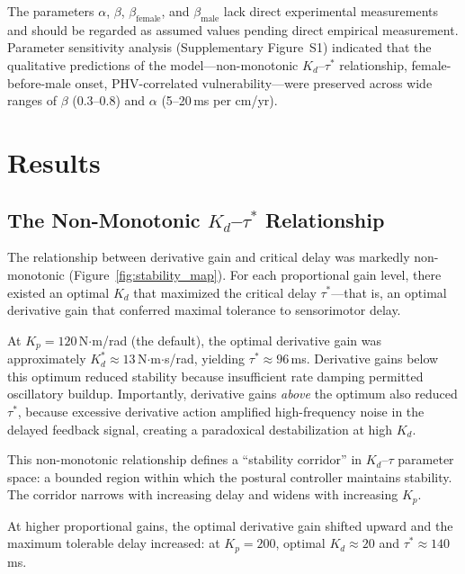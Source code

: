 \documentclass[12pt,a4paper]{article}
\begin{document}
The parameters $\alpha$, $\beta$, $\beta_{\text{female}}$, and $\beta_{\text{male}}$ lack direct experimental measurements and should be regarded as assumed values pending direct empirical measurement. Parameter sensitivity analysis (Supplementary Figure~S1) indicated that the qualitative predictions of the model---non-monotonic $K_d$--$\tau^*$ relationship, female-before-male onset, PHV-correlated vulnerability---were preserved across wide ranges of $\beta$ (0.3--0.8) and $\alpha$ (5--20\,ms per cm/yr).

\section{Results}

\subsection{The Non-Monotonic $K_d$--$\tau^*$ Relationship}

The relationship between derivative gain and critical delay was markedly non-monotonic (Figure~\ref{fig:stability_map}). For each proportional gain level, there existed an optimal $K_d$ that maximized the critical delay $\tau^*$---that is, an optimal derivative gain that conferred maximal tolerance to sensorimotor delay.

At $K_p = 120$\,N$\cdot$m/rad (the default), the optimal derivative gain was approximately $K_d^* \approx 13$\,N$\cdot$m$\cdot$s/rad, yielding $\tau^* \approx 96$\,ms. Derivative gains below this optimum reduced stability because insufficient rate damping permitted oscillatory buildup. Importantly, derivative gains \textit{above} the optimum also reduced $\tau^*$, because excessive derivative action amplified high-frequency noise in the delayed feedback signal, creating a paradoxical destabilization at high $K_d$.

This non-monotonic relationship defines a ``stability corridor'' in $K_d$--$\tau$ parameter space: a bounded region within which the postural controller maintains stability. The corridor narrows with increasing delay and widens with increasing $K_p$.

At higher proportional gains, the optimal derivative gain shifted upward and the maximum tolerable delay increased: at $K_p = 200$, optimal $K_d \approx 20$ and $\tau^* \approx 140$\,ms.
\end{document}
